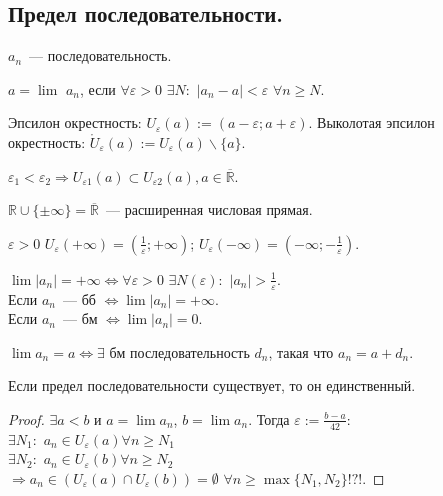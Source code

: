 \documentclass[12pt]{article}
\begin{document}
	\subsection{Предел последовательности.}
	$a_n$~--- последовательность.
	\begin{definition}
		$a = \lim$ $a_n$, если $\forall \varepsilon > 0$ $\exists N:$ $|a_n - a| < \varepsilon$ $\forall n \geqslant N$.
	\end{definition}
	\begin{definition}
		Эпсилон окрестность: $U_{\varepsilon} (a) := (a - \varepsilon; a + \varepsilon)$. Выколотая эпсилон окрестность: $\mathring{U}_{\varepsilon} (a) := U_{\varepsilon}(a) \backslash \{a\}$.
	\end{definition}
	\noindent
	$\varepsilon_1 < \varepsilon_2 \Rightarrow U_{\varepsilon1}(a) \subset U_{\varepsilon2}(a), a \in \overline{\mathbb{R}}$.
	\begin{definition}
		$\mathbb{R} \cup \{\pm \infty\} = \overline{\mathbb{R}}$~--- расширенная числовая прямая.
	\end{definition}
	\begin{definition}
		$\varepsilon > 0$ $U_{\varepsilon} (+ \infty) = (\frac{1}{\varepsilon}; + \infty)$; $U_{\varepsilon}(- \infty) = (- \infty; -\frac{1}{\varepsilon})$.
	\end{definition}
	\noindent
	$\lim |a_n| = + \infty \Leftrightarrow \forall \varepsilon > 0$ $\exists N(\varepsilon):$ $|a_n| > \frac{1}{\varepsilon}$. \\
	Если $a_n$~--- бб $\Leftrightarrow \lim |a_n| = + \infty$. \\
	Если $a_n$~--- бм $\Leftrightarrow \lim |a_n| = 0$.
	\begin{statement}
		$\lim a_n = a \Leftrightarrow \exists$ бм последовательность $d_n$, такая что $a_n = a + d_n$.
	\end{statement}
	\begin{statement}
		Если предел последовательности существует, то он единственный.
	\end{statement}
	\begin{proof}
		$\exists a < b$ и $a = \lim a_n$, $b = \lim a_n$. Тогда $\varepsilon := \frac{b - a}{42}:$ \\
		$\exists N_1:$ $a_n \in U_{\varepsilon} (a) \forall n \geqslant N_1$ \\
		$\exists N_2:$ $a_n \in U_{\varepsilon} (b) \forall n \geqslant N_2$ \\
		$\Rightarrow a_n \in (U_{\varepsilon} (a) \cap U_{\varepsilon} (b)) = \emptyset$ $\forall n \geqslant \max\{N_1, N_2\} !?!$.
	\end{proof}
\end{document}
